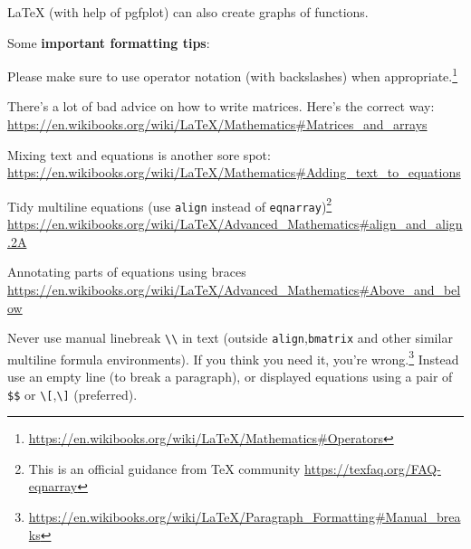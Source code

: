 \documentclass{amsart}
\begin{document}
LaTeX (with help of pgfplot) can also create graphs of functions.
\begin{figure}[htb]\centering
 \end{figure}

 Some \textbf{important formatting tips}:
\begin{compactitem}
\item Please make sure to use operator notation (with backslashes) when appropriate.\footnote{\url{https://en.wikibooks.org/wiki/LaTeX/Mathematics\#Operators}}
\item There's a lot of bad advice on how to write matrices. Here's the correct way: \url{https://en.wikibooks.org/wiki/LaTeX/Mathematics\#Matrices_and_arrays}
\item Mixing text and equations is another sore spot: \url{https://en.wikibooks.org/wiki/LaTeX/Mathematics\#Adding_text_to_equations}
\item Tidy multiline equations (use \verb|align| instead of \verb|eqnarray|)\footnote{This is an official guidance from TeX community \url{https://texfaq.org/FAQ-eqnarray}} \url{https://en.wikibooks.org/wiki/LaTeX/Advanced_Mathematics\#align_and_align.2A}
\item Annotating parts of equations using braces \url{https://en.wikibooks.org/wiki/LaTeX/Advanced_Mathematics\#Above_and_below}
\item Never use manual linebreak \verb|\\| in text (outside \verb|align|,\verb|bmatrix| and other similar multiline formula environments). If you think you need it, you're wrong.\footnote{\url{https://en.wikibooks.org/wiki/LaTeX/Paragraph_Formatting\#Manual_breaks}} Instead use an empty line (to break a paragraph), or displayed equations using a pair of \verb|$$| or \verb|\[|,\verb|\]| (preferred).
\end{compactitem}
\end{document}

